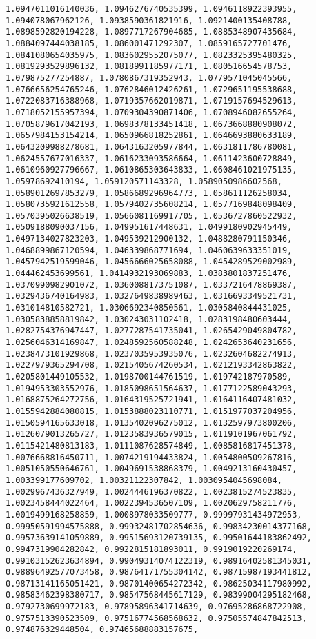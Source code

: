 \documentclass[11pt]{article}
\begin{document}
\begin{Verbatim}[commandchars=\\\{\}]
1.0947011016140036, 1.0946276740535399, 1.0946118922393955, 1.094078067962126, 1.0938590361821916, 1.0921400135408788, 1.0898592820194228, 1.0897717267904685, 1.0885348907435684, 1.0884097444038185, 1.086001471292307, 1.0859165727701476, 1.0841080654035975, 1.0836029552075077, 1.0823325395480325, 1.0819293529896132, 1.0818991185977171, 1.080516654578753, 1.079875277254887, 1.0780867319352943, 1.0779571045045566, 1.0766656254765246, 1.0762846012426261, 1.0729651195538688, 1.0722083716388968, 1.0719357662019871, 1.0719157694529613, 1.0718052155957394, 1.0709304390871406, 1.0708946082655264, 1.0705879617042193, 1.0698378133451418, 1.0673668880908072, 1.0657984153154214, 1.0650966818252861, 1.0646693880633189, 1.0643209988278681, 1.0643163205977844, 1.0631811786780081, 1.0624557677016337, 1.0616233093586664, 1.0611423600728849, 1.0610960927796667, 1.0610865303643833, 1.0608461021975135, 1.05978692410194, 1.059120571143328, 1.0589050986602568, 1.0589012697853279, 1.0586689296964773, 1.058611126258034, 1.0580735921612558, 1.0579402735608214, 1.0577169848098409, 1.0570395026638519, 1.0566081169917705, 1.0536727860522932, 1.0509188090037156, 1.049951617448631, 1.0499180902945449, 1.0497134027823203, 1.049539212900132, 1.0488280791150346, 1.0468899867120594, 1.046339868771694, 1.0460639633351019, 1.0457942519599046, 1.0456666025658088, 1.0454289529002989, 1.044462453699561, 1.0414932193069883, 1.0383801837251476, 1.0370990982901072, 1.0360088173751087, 1.0337216478869387, 1.0329436740164983, 1.0327649838989463, 1.0316693349521731, 1.031014810582721, 1.0306692340850561, 1.0305840844431025, 1.0305838858819842, 1.030243031102418, 1.0283198480603444, 1.0282754376947447, 1.0277287541735041, 1.0265429049804782, 1.0256046314169847, 1.0248592560588248, 1.0242653640231656, 1.0238473101929868, 1.0237035953935076, 1.0232604682274913, 1.0227979365294708, 1.0215405674260534, 1.0212193342863822, 1.0205801449105532, 1.0198700144761519, 1.019742187970589, 1.0194953303552976, 1.0185098651564637, 1.0177122589043293, 1.0168875264272756, 1.0164319525721941, 1.0164116407481032, 1.0155942884080815, 1.0153888023110771, 1.0151977037204956, 1.0150594165633018, 1.0135402096275012, 1.0132597973800206, 1.0126079013265727, 1.0123583936579015, 1.0119101967061792, 1.0115421480813183, 1.0111087628574849, 1.0085816817451378, 1.0076668816450711, 1.0074219194433824, 1.0054800509267816, 1.0051050550646761, 1.0049691538868379, 1.0049213160430457, 1.003399177609702, 1.00321122307842, 1.0030954045698084, 1.0029967436327949, 1.0024446196370822, 1.0023815274523835, 1.0023458444022464, 1.0022394536507109, 1.0020629758211776, 1.0019499168258859, 1.0008978033509777, 0.99997931434972953, 0.99950591994575888, 0.99932481702854636, 0.99834230014377168, 0.99573639141059889, 0.99515693120739135, 0.99501644183862492, 0.9947319904282842, 0.9922815181893011, 0.9919019220269174, 0.99103152623634894, 0.99049314074122319, 0.98916402581345031, 0.98896492577073458, 0.98764171755304142, 0.98715987193441812, 0.98713141165051421, 0.98701400654272342, 0.98625034117980992, 0.98583462398380717, 0.98547568445617129, 0.98399004295182468, 0.9792730699972183, 0.97895896341714639, 0.97695286868722908, 0.9757513390523509, 0.97516774568568632, 0.97505574847842513, 0.974876329448504, 0.97465688883157675, 
\end{Verbatim}
\end{document}
